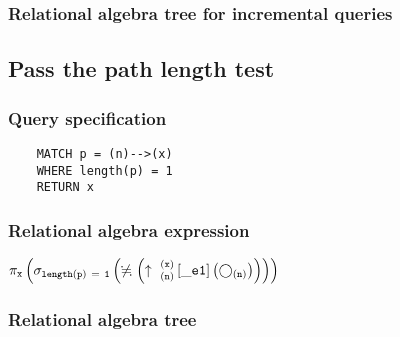 	\subsubsection*{Relational algebra tree for incremental queries}

	\subsection{Pass the path length test}

	\subsubsection*{Query specification}

	\begin{lstlisting}
	MATCH p = (n)-->(x)
	WHERE length(p) = 1
	RETURN x
	\end{lstlisting}


	\subsubsection*{Relational algebra expression}

	$\projection{\var{x}} \left(\selection{\mathtt{length(p)~=~1}} \left(\alldifferent{} \left(\expandout{n}{x}{}{\_e1}{} \left(\getvertices{n}{}\right)\right)\right)\right)$

	\subsubsection*{Relational algebra tree}


